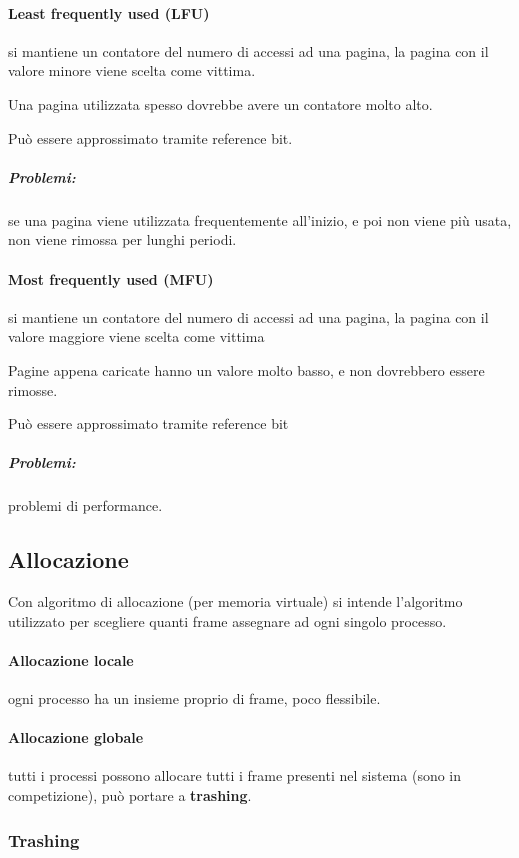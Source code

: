 \paragraph{Least frequently used (LFU)} si mantiene un contatore del numero di accessi ad una pagina, la pagina con il valore minore viene scelta come vittima.

Una pagina utilizzata spesso dovrebbe avere un contatore molto alto.

Può essere approssimato tramite reference bit.

\subparagraph{Problemi:} se una pagina viene utilizzata frequentemente all'inizio, e poi non viene più usata, non viene rimossa per lunghi periodi.

\paragraph{Most frequently used (MFU)}
si mantiene un contatore del numero di accessi ad una pagina, la pagina con il valore maggiore viene scelta come vittima

Pagine appena caricate hanno un valore molto basso, e non dovrebbero essere rimosse.

Può essere approssimato tramite reference bit

\subparagraph{Problemi:} problemi di performance.

\subsection{Allocazione}
Con algoritmo di allocazione (per memoria virtuale) si intende l'algoritmo utilizzato per scegliere quanti frame assegnare ad ogni
singolo processo.

\paragraph{Allocazione locale} ogni processo ha un insieme proprio di frame, poco flessibile.

\paragraph{Allocazione globale} tutti i processi possono allocare tutti i frame presenti nel sistema (sono in competizione), può portare a \textbf{trashing}.

\subsubsection{Trashing}
